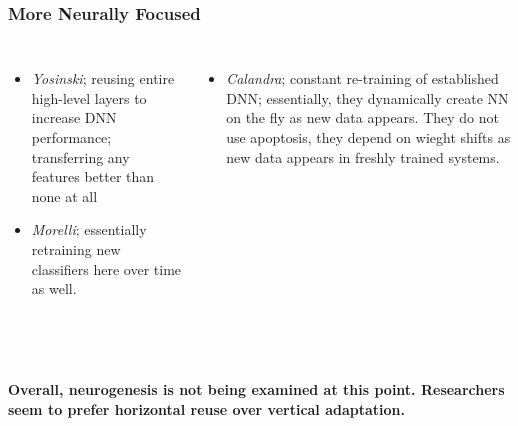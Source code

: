 \documentclass[t,handout]{beamer}
\begin{document}
\begin{frame}
\frametitle{More Neurally Focused}
\begin{columns}

\footnotesize{
\begin{itemize}
\item \textit{Yosinski};  reusing entire high-level layers to increase DNN performance; transferring any features better than none at all
\item \textit{Morelli}; essentially retraining new classifiers here over time as well.
\end{itemize}
}

\footnotesize{
\begin{itemize}
\item \textit{Calandra}; constant re-training of established DNN; essentially, they dynamically create NN on the fly as new data appears. They do not use apoptosis, they depend on wieght shifts as new data appears in freshly trained systems.
\end{itemize}
}

\end{columns}
~\\~\\
\textbf{Overall, neurogenesis is not being examined at this point. Researchers seem to prefer horizontal reuse over vertical adaptation.}
\end{frame}
\end{document}
